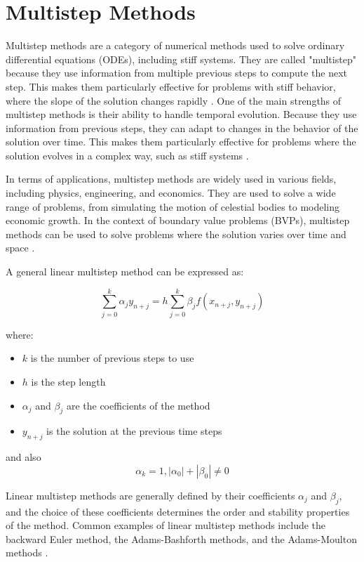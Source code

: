 \newpage

\section{Multistep Methods}
Multistep methods are a category of numerical methods used to solve ordinary differential equations (ODEs), including stiff systems. They are called "multistep" because they use information from multiple previous steps to compute the next step. This makes them particularly effective for problems with stiff behavior, where the slope of the solution changes rapidly \cite{math7121158}.
One of the main strengths of multistep methods is their ability to handle temporal evolution. Because they use information from previous steps, they can adapt to changes in the behavior of the solution over time. This makes them particularly effective for problems where the solution evolves in a complex way, such as stiff systems \cite{math7121158}.

In terms of applications, multistep methods are widely used in various fields, including physics, engineering, and economics. They are used to solve a wide range of problems, from simulating the motion of celestial bodies to modeling economic growth. In the context of boundary value problems (BVPs), multistep methods can be used to solve problems where the solution varies over time and space \cite{math7121158}.

A general linear multistep method can be expressed as:

\begin{equation}
\sum_{j=0}^{k} \alpha_j y_{n+j} = h \sum_{j=0}^{k} \beta_j f(x_{n+j}, y_{n+j})
\end{equation}

where:


\begin{itemize}
  \item \(k\) is the number of previous steps to use
  \item \(h\) is the step length
  \item \(\alpha_j\) and \(\beta_j\) are the coefficients of the method
  \item \(y_{n+j}\) is the solution at the previous time steps
\end{itemize}


and also \[\alpha_k = 1, |\alpha_0| +| \beta_0 | \neq 0 \]

Linear multistep methods are generally defined by their coefficients \(\alpha_j\) and \(\beta_j\), and the choice of these coefficients determines the order and stability properties of the method. Common examples of linear multistep methods include the backward Euler method, the Adams-Bashforth methods, and the Adams-Moulton methods \cite{lambert1977}.


